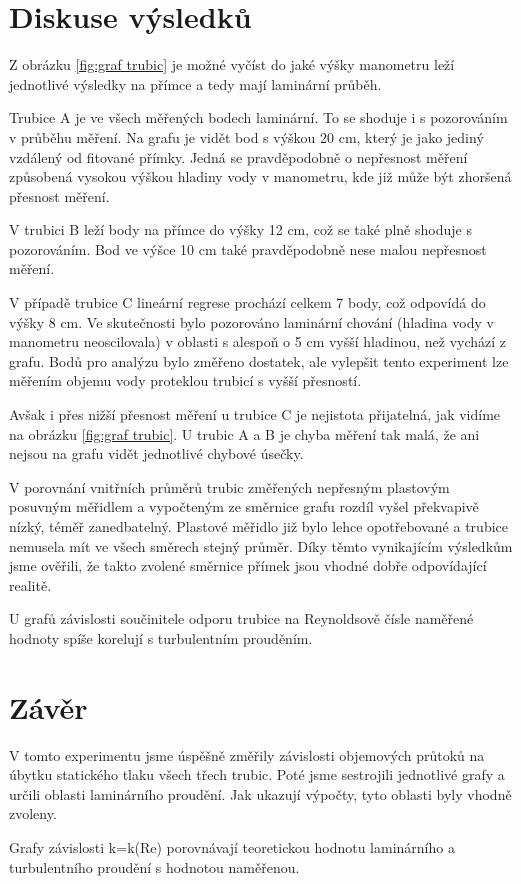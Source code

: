 \section{Diskuse výsledků}

    Z obrázku \ref{fig:graf trubic} je možné vyčíst do jaké výšky manometru leží jednotlivé výsledky na přímce a tedy mají laminární průběh.

    Trubice A je ve všech měřených bodech laminární. To se shoduje i s pozorováním v průběhu měření. Na grafu je vidět bod s výškou 20 cm, který je jako jediný vzdálený od fitované přímky. Jedná se pravděpodobně o nepřesnost měření způsobená vysokou výškou hladiny vody v manometru, kde již může být zhoršená přesnost měření.

    V trubici B leží body na přímce do výšky 12 cm, což se také plně shoduje s pozorováním. Bod ve výšce 10 cm také pravděpodobně nese malou nepřesnost měření.

    V případě trubice C lineární regrese prochází celkem 7 body, což odpovídá do výšky 8 cm. Ve skutečnosti bylo pozorováno laminární chování (hladina vody v manometru neoscilovala) v oblasti s alespoň o 5 cm vyšší hladinou, než vychází z grafu. Bodů pro analýzu bylo změřeno dostatek, ale vylepšit tento experiment lze měřením objemu vody proteklou trubicí s vyšší přesností.

    Avšak i přes nižší přesnost měření u trubice C je nejistota přijatelná, jak vidíme na obrázku \ref{fig:graf trubic}. U trubic A a B je chyba měření tak malá, že ani nejsou na grafu vidět jednotlivé chybové úsečky.

    V porovnání vnitřních průměrů trubic změřených nepřesným plastovým posuvným měřidlem a vypočteným ze směrnice grafu rozdíl vyšel překvapivě nízký, téměř zanedbatelný. Plastové měřidlo již bylo lehce opotřebované a trubice nemusela mít ve všech směrech stejný průměr. Díky těmto vynikajícím výsledkům jsme ověřili, že takto zvolené směrnice přímek jsou vhodné dobře odpovídající realitě.

    U grafů závislosti součinitele odporu trubice na Reynoldsově čísle naměřené hodnoty spíše korelují s turbulentním prouděním.

\section{Závěr}

    V tomto experimentu jsme úspěšně změřily závislosti objemových průtoků na úbytku statického tlaku všech třech trubic. Poté jsme sestrojili jednotlivé grafy a určili oblasti laminárního proudění. Jak ukazují výpočty, tyto oblasti byly vhodně zvoleny.

    Grafy závislosti k=k(Re) porovnávají teoretickou hodnotu laminárního a turbulentního proudění s hodnotou naměřenou.
